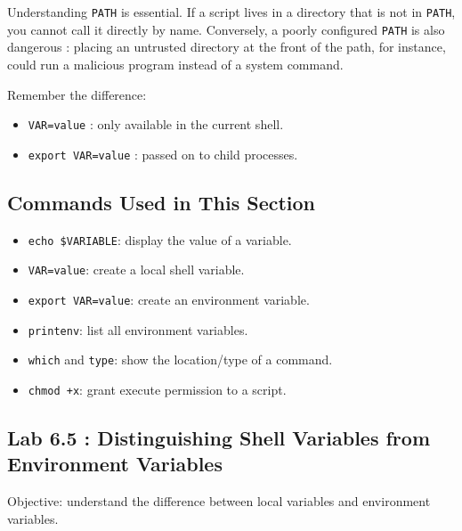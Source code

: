 Understanding \texttt{PATH} is essential. If a script lives in a directory
that is not in \texttt{PATH}, you cannot call it directly by name. Conversely,
a poorly configured \texttt{PATH} is also dangerous : placing an untrusted
directory at the front of the path, for instance, could run a malicious
program instead of a system command.

\begin{tipbox}
Remember the difference:
\begin{itemize}
  \item \texttt{VAR=value} : only available in the current shell.
  \item \texttt{export VAR=value} : passed on to child processes.
\end{itemize}
\end{tipbox}

\subsection*{Commands Used in This Section}

\begin{itemize}
  \item \texttt{echo \$VARIABLE}: display the value of a variable.
  \item \texttt{VAR=value}: create a local shell variable.
  \item \texttt{export VAR=value}: create an environment variable.
  \item \texttt{printenv}: list all environment variables.
  \item \texttt{which} and \texttt{type}: show the location/type of a command.
  \item \texttt{chmod +x}: grant execute permission to a script.
\end{itemize}

\subsection*{Lab 6.5 : Distinguishing Shell Variables from Environment Variables}

Objective: understand the difference between local variables and environment
variables.

